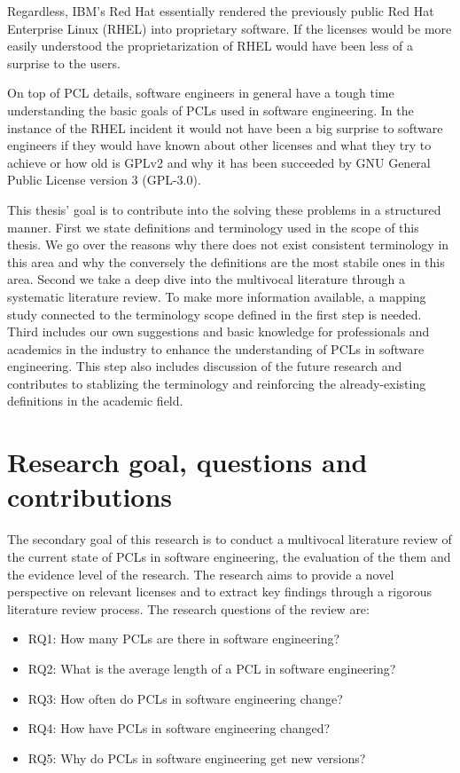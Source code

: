 Regardless, IBM's Red Hat essentially rendered the previously public Red Hat Enterprise Linux (RHEL) into proprietary software. If the licenses would be more easily understood the proprietarization of RHEL would have been less of a surprise to the users.

On top of PCL details, software engineers in general have a tough time understanding the basic goals of PCLs used in software engineering. In the instance of the RHEL incident it would not have been a big surprise to software engineers if they would have known about other licenses and what they try to achieve or how old is GPLv2 and why it has been succeeded by GNU General Public License version 3 (GPL-3.0).

This thesis' goal is to contribute into the solving these problems in a structured manner. First we state definitions and terminology used in the scope of this thesis. We go over the reasons why there does not exist consistent terminology in this area and why the conversely the definitions are the most stabile ones in this area. Second we take a deep dive into the multivocal literature through a systematic literature review. To make more information available, a mapping study connected to the terminology scope defined in the first step is needed. Third includes our own suggestions and basic knowledge for professionals and academics in the industry to enhance the understanding of PCLs in software engineering. This step also includes discussion of the future research and contributes to stablizing the terminology and reinforcing the already-existing definitions in the academic field.

\section{Research goal, questions and contributions}
The secondary goal of this research is to conduct a multivocal literature review of the current state of PCLs in software engineering, the evaluation of the them and the evidence level of the research. The research aims to provide a novel perspective on relevant licenses and to extract key findings through a rigorous literature review process. The research questions of the review are:
\begin{itemize}
	\item RQ1: How many PCLs are there in software engineering?
	\item RQ2: What is the average length of a PCL in software engineering?
	\item RQ3: How often do PCLs in software engineering change?
	\item RQ4: How have PCLs in software engineering changed?
	\item RQ5: Why do PCLs in software engineering get new versions?
\end{itemize}

